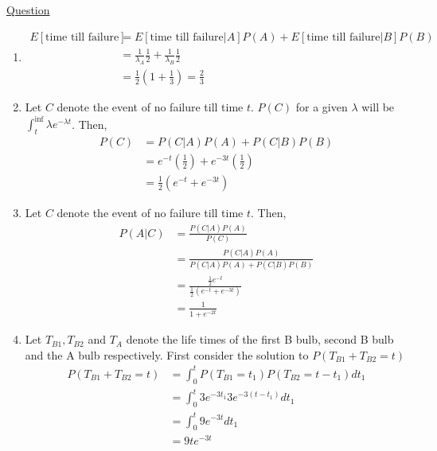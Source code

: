 \documentclass[../probability-notes.tex]{subfiles}
\begin{document}
\begin{enumerate}
        
        \hypertarget{a_poissonbulb2}{\item} \hyperlink{q_poissonbulb2}{Question}\newline
        \begin{enumerate}
            \item 
            \begin{align*}
                E[\text{time till failure}] &= E[\text{time till failure}|A]P(A) + E[\text{time till failure}|B]P(B)\\
                &= \frac{1}{\lambda_{A}} \frac{1}{2} + \frac{1}{\lambda_{B}} \frac{1}{2}\\
                &= \frac{1}{2}(1 + \frac{1}{3}) = \frac{2}{3}
            \end{align*}

            \item Let $C$ denote the event of no failure till time $t$. $P(C)$ for a given $\lambda$ will be $\int_{t}^{\inf} \lambda e^{-\lambda t}$. Then,
            \begin{align*}
                P(C) &= P(C|A)P(A) + P(C|B)P(B) \tag*{Using total probability theorem}\\
                     &= e^{-t}(\frac{1}{2}) + e^{-3t}(\frac{1}{2})\\
                     &= \frac{1}{2}(e^{-t} + e^{-3t})
            \end{align*}

            \item \label{itm:a_poissonbulb2_c} Let $C$ denote the event of no failure till time $t$. Then,
            \begin{align*}
                P(A|C) &= \frac{P(C|A)P(A)}{P(C)}\\
                       &= \frac{P(C|A)P(A)}{P(C|A)P(A) + P(C|B)P(B)}\\
                       &= \frac{\frac{1}{2} e^{-t}}{\frac{1}{2}(e^{-t} + e^{-3t})}\\
                       &= \frac{1}{1 + e^{-2t}}
            \end{align*}

            \item Let $T_{B1}, T_{B2}$ and $T_{A}$ denote the life times of the first B bulb, second B bulb and the A bulb respectively. First consider the solution to $P(T_{B1} + T_{B2} = t)$
            \begin{align*}
                P(T_{B1} + T_{B2} = t) &= \int_{0}^{t} P(T_{B1} = t_{1})P(T_{B2} = t - t_{1}) dt_{1} \tag*{Using independence}\\
                &= \int_{0}^{t} 3e^{-3t_{1}} 3e^{-3(t - t_{1})} dt_{1}\\
                &= \int_{0}^{t} 9e^{-3t}dt_{1}\\
                &= 9te^{-3t}
            \end{align*}
            

\end{enumerate}
\end{enumerate}
\end{document}
